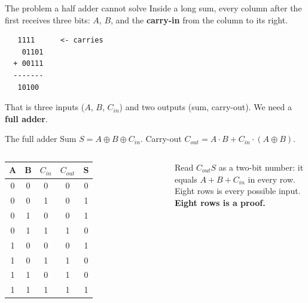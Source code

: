 \documentclass[aspectratio=169,10pt]{beamer}
\begin{document}
\begin{frame}[fragile]{The problem a half adder cannot solve}
Inside a long sum, every column after the first receives three bits: $A$, $B$, and the \textbf{carry-in} from the column to its right.
\begin{verbatim}
   1111      <- carries
    01101
  + 00111
  -------
   10100
\end{verbatim}
That is three inputs ($A$, $B$, $C_{in}$) and two outputs (sum, carry-out). We need a \textbf{full adder}.
\end{frame}

\begin{frame}{The full adder}
Sum $S=A\oplus B\oplus C_{in}$. Carry-out $C_{out}=A\cdot B+C_{in}\cdot(A\oplus B)$.
\begin{columns}
\begin{tabular}{ccc|cc}
A&B&$C_{in}$&$C_{out}$&S\\\hline
0&0&0&0&0\\
0&0&1&0&1\\
0&1&0&0&1\\
0&1&1&1&0\\
1&0&0&0&1\\
1&0&1&1&0\\
1&1&0&1&0\\
1&1&1&1&1
\end{tabular}
Read $C_{out}S$ as a two-bit number: it equals $A+B+C_{in}$ in every row.\\[6pt]
Eight rows is every possible input. \textbf{Eight rows is a proof.}
\end{columns}
\end{frame}
\end{document}
